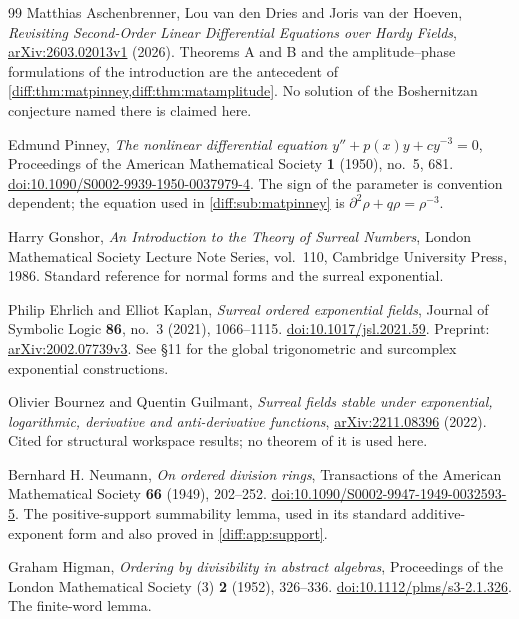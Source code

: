 \documentclass[11pt,letterpaper]{article}
\numberwithin{equation}{section}
\theoremstyle{definition}
\theoremstyle{remark}
\newcommand{\der}{\partial}
\begin{document}
\begin{thebibliography}{99}
Matthias Aschenbrenner, Lou van den Dries and Joris van der Hoeven,
\emph{Revisiting Second-Order Linear Differential Equations over Hardy Fields},
\href{https://arxiv.org/abs/2603.02013v1}{arXiv:2603.02013v1} (2026).
Theorems A and B and the amplitude--phase formulations of the introduction are
the antecedent of
\cref{diff:thm:matpinney,diff:thm:matamplitude}. No solution of the
Boshernitzan conjecture named there is claimed here.

Edmund Pinney,
\emph{The nonlinear differential equation $y''+p(x)y+cy^{-3}=0$},
Proceedings of the American Mathematical Society \textbf{1} (1950), no.~5,
681.
\href{https://doi.org/10.1090/S0002-9939-1950-0037979-4}{doi:10.1090/S0002-9939-1950-0037979-4}.
The sign of the parameter is convention dependent; the equation used in
\cref{diff:sub:matpinney} is $\der^{2}\rho+q\rho=\rho^{-3}$.

Harry Gonshor,
\emph{An Introduction to the Theory of Surreal Numbers},
London Mathematical Society Lecture Note Series, vol.~110,
Cambridge University Press, 1986.
Standard reference for normal forms and the surreal exponential.

Philip Ehrlich and Elliot Kaplan,
\emph{Surreal ordered exponential fields},
Journal of Symbolic Logic \textbf{86}, no.~3 (2021), 1066--1115.
\href{https://doi.org/10.1017/jsl.2021.59}{doi:10.1017/jsl.2021.59}.
Preprint: \href{https://arxiv.org/abs/2002.07739}{arXiv:2002.07739v3}.
See \S11 for the global trigonometric and surcomplex exponential
constructions.

Olivier Bournez and Quentin Guilmant,
\emph{Surreal fields stable under exponential, logarithmic, derivative and
anti-derivative functions},
\href{https://arxiv.org/abs/2211.08396}{arXiv:2211.08396} (2022).
Cited for structural workspace results; no theorem of it is used here.

Bernhard H. Neumann,
\emph{On ordered division rings},
Transactions of the American Mathematical Society \textbf{66} (1949),
202--252.
\href{https://doi.org/10.1090/S0002-9947-1949-0032593-5}{doi:10.1090/S0002-9947-1949-0032593-5}.
The positive-support summability lemma, used in its standard
additive-exponent form and also proved in \cref{diff:app:support}.

Graham Higman,
\emph{Ordering by divisibility in abstract algebras},
Proceedings of the London Mathematical Society (3) \textbf{2} (1952),
326--336.
\href{https://doi.org/10.1112/plms/s3-2.1.326}{doi:10.1112/plms/s3-2.1.326}.
The finite-word lemma.


\end{thebibliography}
\end{document}
